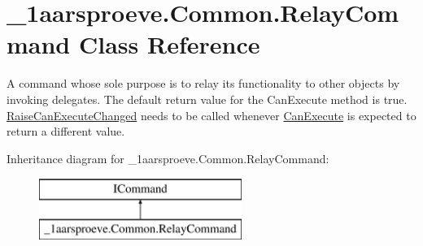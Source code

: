 \hypertarget{class__1aarsproeve_1_1_common_1_1_relay_command}{}\section{\+\_\+1aarsproeve.\+Common.\+Relay\+Command Class Reference}
\label{class__1aarsproeve_1_1_common_1_1_relay_command}


A command whose sole purpose is to relay its functionality to other objects by invoking delegates. The default return value for the Can\+Execute method is \textquotesingle{}true\textquotesingle{}. \hyperlink{class__1aarsproeve_1_1_common_1_1_relay_command_a90744bca5c47a6c212fd7d0cb89182f1}{Raise\+Can\+Execute\+Changed} needs to be called whenever \hyperlink{class__1aarsproeve_1_1_common_1_1_relay_command_a3c52d00e1d9ab7ab06cc4244b50fbee2}{Can\+Execute} is expected to return a different value.  


Inheritance diagram for \+\_\+1aarsproeve.\+Common.\+Relay\+Command\+:\begin{figure}[H]
\begin{center}
\leavevmode
\includegraphics[height=2.000000cm]{class__1aarsproeve_1_1_common_1_1_relay_command}
\end{center}
\end{figure}
